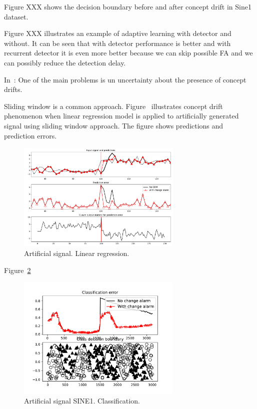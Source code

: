 \documentclass[12 pt]{article}
\begin{document}
  Figure XXX shows the decision boundary before and after concept drift in Sine1 dataset.

  Figure XXX illustrates an example of adaptive learning with detector and without. 
  It can be seen that with detector performance is better and with recurrent detector it is even more better because we can skip possible FA and we can possibly reduce the detection delay.

  In~\cite{SouzaRMB20}: One of the main problems is un uncertainty about the presence of concept drifts.

  Sliding window is a common approach.
  Figure~\cite{fig:art_sig_example} illustrates concept drift phenomenon when linear regression model is applied to artificially generated signal using sliding window approach. 
  The figure shows predictions and prediction errors.
  \begin{figure}[!htb]
    \centering
    \includegraphics[width=0.7\textwidth]{images/proof_of_concept_linreg_art_sig}
    \caption{Artificial signal. Linear regression.}\label{fig:art_sig_example}
  \end{figure}

  Figure~\ref{fig:sine1_example}
  \begin{figure}[!htb]
    \centering
    \includegraphics[width=0.7\textwidth]{images/proof_of_concept_dt_sine1}
    \caption{Artificial signal SINE1. Classification.}\label{fig:sine1_example}
  \end{figure}


  
  
\end{document}
